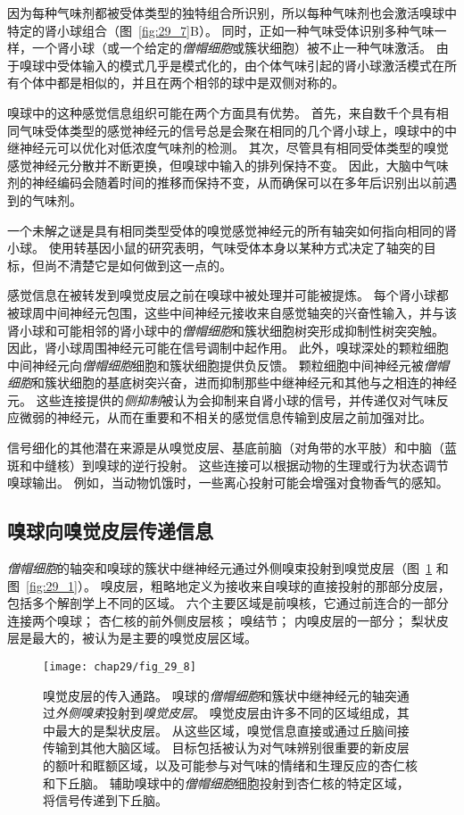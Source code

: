 因为每种气味剂都被受体类型的独特组合所识别，所以每种气味剂也会激活嗅球中特定的肾小球组合（图~\ref{fig:29_7}B）。
同时，正如一种气味受体识别多种气味一样，一个肾小球（或一个给定的\textit{僧帽细胞}或簇状细胞）被不止一种气味激活。
由于嗅球中受体输入的模式几乎是模式化的，由个体气味引起的肾小球激活模式在所有个体中都是相似的，并且在两个相邻的球中是双侧对称的。


嗅球中的这种感觉信息组织可能在两个方面具有优势。
首先，来自数千个具有相同气味受体类型的感觉神经元的信号总是会聚在相同的几个肾小球上，嗅球中的中继神经元可以优化对低浓度气味剂的检测。
其次，尽管具有相同受体类型的嗅觉感觉神经元分散并不断更换，但嗅球中输入的排列保持不变。
因此，大脑中气味剂的神经编码会随着时间的推移而保持不变，从而确保可以在多年后识别出以前遇到的气味剂。


一个未解之谜是具有相同类型受体的嗅觉感觉神经元的所有轴突如何指向相同的肾小球。
使用转基因小鼠的研究表明，气味受体本身以某种方式决定了轴突的目标，但尚不清楚它是如何做到这一点的。


感觉信息在被转发到嗅觉皮层之前在嗅球中被处理并可能被提炼。
每个肾小球都被球周中间神经元包围，这些中间神经元接收来自感觉轴突的兴奋性输入，并与该肾小球和可能相邻的肾小球中的\textit{僧帽细胞}和簇状细胞树突形成抑制性树突突触。
因此，肾小球周围神经元可能在信号调制中起作用。
此外，嗅球深处的颗粒细胞中间神经元向\textit{僧帽细胞}细胞和簇状细胞提供负反馈。
颗粒细胞中间神经元被\textit{僧帽细胞}和簇状细胞的基底树突兴奋，进而抑制那些中继神经元和其他与之相连的神经元。 
这些连接提供的\textit{侧抑制}被认为会抑制来自肾小球的信号，并传递仅对气味反应微弱的神经元，从而在重要和不相关的感觉信息传输到皮层之前加强对比。


信号细化的其他潜在来源是从嗅觉皮层、基底前脑（对角带的水平肢）和中脑（蓝斑和中缝核）到嗅球的逆行投射。
这些连接可以根据动物的生理或行为状态调节嗅球输出。 
例如，当动物饥饿时，一些离心投射可能会增强对食物香气的感知。


\subsection{嗅球向嗅觉皮层传递信息}

\textit{僧帽细胞}的轴突和嗅球的簇状中继神经元通过外侧嗅束投射到嗅觉皮层（图~\ref{fig:29_8} 和图~\ref{fig:29_1}）。
嗅皮层，粗略地定义为接收来自嗅球的直接投射的那部分皮层，包括多个解剖学上不同的区域。
六个主要区域是前嗅核，它通过前连合的一部分连接两个嗅球；
杏仁核的前外侧皮层核；
嗅结节； 内嗅皮层的一部分；
梨状皮层是最大的，被认为是主要的嗅觉皮层区域。


\begin{figure}[htbp]
	\centering
	\texttt{[image: chap29/fig\_29\_8]}
	\caption{嗅觉皮层的传入通路。
		嗅球的\textit{僧帽细胞}和簇状中继神经元的轴突通过\textit{外侧嗅束}投射到\textit{嗅觉皮层}。
		嗅觉皮层由许多不同的区域组成，其中最大的是梨状皮层。
		从这些区域，嗅觉信息直接或通过丘脑间接传输到其他大脑区域。
		目标包括被认为对气味辨别很重要的新皮层的额叶和眶额区域，以及可能参与对气味的情绪和生理反应的杏仁核和下丘脑。
		辅助嗅球中的\textit{僧帽细胞}细胞投射到杏仁核的特定区域，将信号传递到下丘脑。}
	\label{fig:29_8}
\end{figure}


